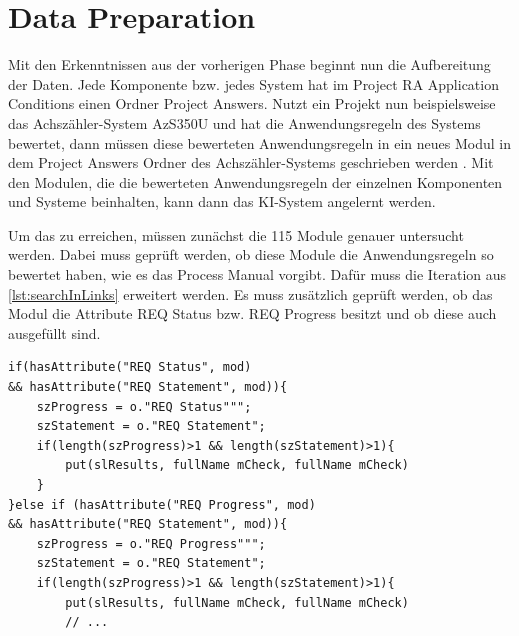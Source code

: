 \section{Data Preparation}

Mit den Erkenntnissen aus der vorherigen Phase beginnt nun die Aufbereitung der Daten. Jede Komponente bzw. jedes System hat im Project RA Application Conditions einen Ordner  Project
Answers\grqq{}. Nutzt ein Projekt nun beispielsweise das Achszähler-System AzS350U und hat die Anwendungsregeln des Systems bewertet, dann müssen diese bewerteten Anwendungsregeln in ein neues Modul 
in dem  Project Answers\grqq{} Ordner des Achszähler-Systems geschrieben werden \cite[S.21]{q2}. Mit den Modulen, die die bewerteten Anwendungsregeln der einzelnen Komponenten und Systeme 
beinhalten, kann dann das KI-System angelernt werden. 

Um das zu erreichen, müssen zunächst die 115 Module genauer untersucht werden. Dabei muss geprüft werden, ob diese Module die Anwendungsregeln so bewertet haben, wie es das Process Manual vorgibt.
Dafür muss die Iteration aus \ref*{lst:searchInLinks} erweitert werden. Es muss zusätzlich geprüft werden, ob das Modul die Attribute REQ Status bzw. REQ Progress besitzt und ob diese auch 
ausgefüllt sind. 

\begin{lstlisting}[caption={Suche nach bewerteten Anwendungsregeln},captionpos=b, label = lst:searchARSolutions]                                                       
if(hasAttribute("REQ Status", mod) 
&& hasAttribute("REQ Statement", mod)){  
    szProgress = o."REQ Status""";
    szStatement = o."REQ Statement";
    if(length(szProgress)>1 && length(szStatement)>1){ 
        put(slResults, fullName mCheck, fullName mCheck)
    }
}else if (hasAttribute("REQ Progress", mod) 
&& hasAttribute("REQ Statement", mod)){
    szProgress = o."REQ Progress""";
    szStatement = o."REQ Statement";
    if(length(szProgress)>1 && length(szStatement)>1){ 
        put(slResults, fullName mCheck, fullName mCheck)
        // ...
\end{lstlisting}

